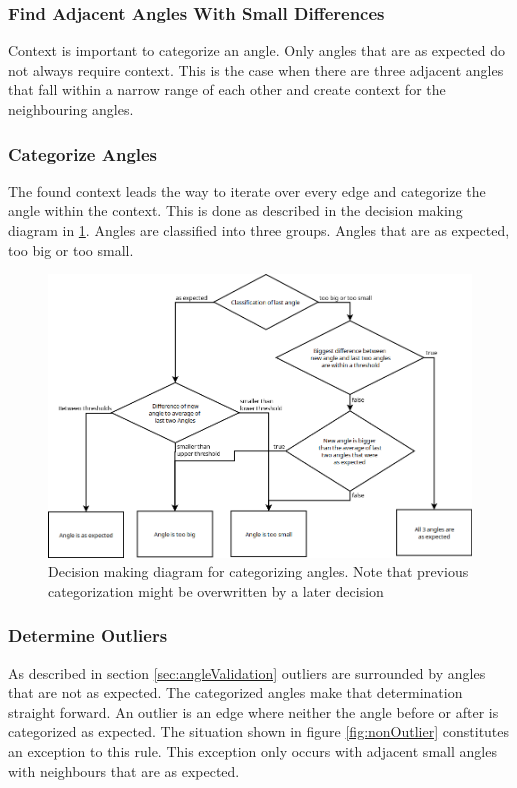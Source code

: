 \subsubsection{Find Adjacent Angles With Small Differences}
Context is important to categorize an angle. Only angles that are as expected do not always require context. This is the case when there are three adjacent angles that fall within a narrow range of each other and create context for the neighbouring angles.

\subsubsection{Categorize Angles}
The found context leads the way to iterate over every edge and categorize the angle within the context. This is done as described in the decision making diagram in \ref{fig:decisionMaking}. Angles are classified into three groups. Angles that are as expected, too big or too small. 

\begin{figure}[H]
	\centering
	\includegraphics[width=.9\linewidth]{images/angleclassification.png}
	\caption{Decision making diagram for categorizing angles. Note that previous categorization might be overwritten by a later decision}
	\label{fig:decisionMaking}
\end{figure}
\subsubsection{Determine Outliers}
As described in section \ref{sec:angleValidation} outliers are surrounded by angles that are not as expected. The categorized angles make that determination straight forward. An outlier is an edge where neither the angle before or after is categorized as expected. 
The situation shown in figure \ref{fig:nonOutlier} constitutes an exception to this rule. This exception only occurs with adjacent small angles with neighbours that are as expected. 
